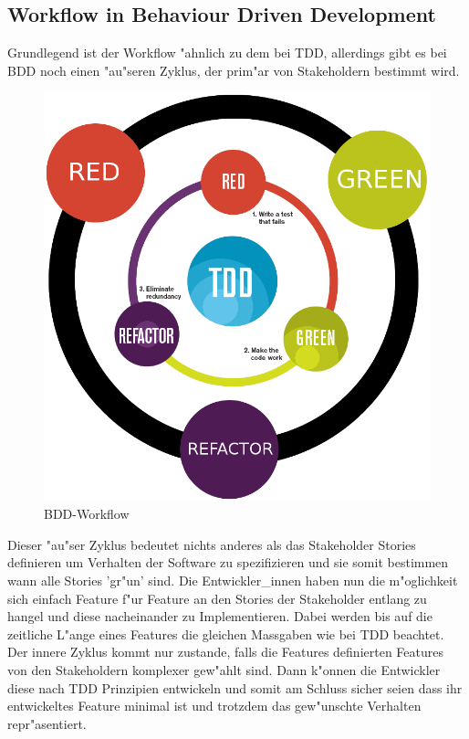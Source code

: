   \subsection{Workflow in Behaviour Driven Development}
    Grundlegend ist der Workflow "ahnlich zu dem bei TDD, allerdings gibt es 
    bei BDD noch einen "au"seren Zyklus, der prim"ar von Stakeholdern bestimmt wird.
    \begin{figure}
      \vspace{-30pt}
      \begin{center}
        \includegraphics[scale=0.3]{assets/bdd_flow.png}
      \end{center}
      \caption{BDD-Workflow}
      \vspace{-15pt}
    \end{figure}
    Dieser "au"ser Zyklus bedeutet nichts anderes als das Stakeholder Stories
    definieren um Verhalten der Software zu spezifizieren und sie somit bestimmen
    wann alle Stories 'gr"un' sind. Die Entwickler\_innen haben nun die m"oglichkeit sich einfach Feature f"ur Feature an den Stories der Stakeholder entlang zu 
    hangel und diese nacheinander zu Implementieren. Dabei werden bis auf die 
    zeitliche L"ange eines Features die gleichen Massgaben wie bei TDD beachtet.\\
    Der innere Zyklus kommt nur zustande, falls die Features definierten Features
    von den Stakeholdern komplexer gew"ahlt sind. Dann k"onnen die Entwickler 
    diese nach TDD Prinzipien entwickeln und somit am Schluss sicher seien 
    dass ihr entwickeltes Feature minimal ist und trotzdem das gew"unschte 
    Verhalten repr"asentiert.\\

